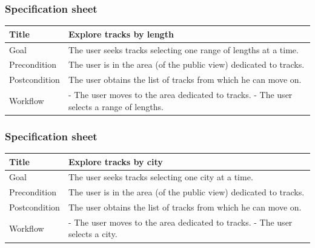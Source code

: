 \documentclass{beamer}
\begin{document}
\begin{frame}
    \frametitle{Specification sheet}
    \begin{table}
        \tiny
        \begin{tabular}{|p{2cm}|p{6cm}|}
        \hline
        Title & \textbf{Explore tracks by length} \\
        \hline
        Goal & The user seeks tracks selecting one range of lengths at a time. \\
        \hline
        Precondition & The user is in the area (of the public view) dedicated to tracks.\\
        \hline
        Postcondition & The user obtains the list of tracks from which he can move on.\\
        \hline
        Workflow &
        - The user moves to the area dedicated to tracks. \newline
        - The user selects a range of lengths. \\
        \hline
        \end{tabular}
\end{table}
\end{frame}

\begin{frame}
    \frametitle{Specification sheet}
    \begin{table}
        \tiny
        \begin{tabular}{|p{2cm}|p{6cm}|}
        \hline
        Title & \textbf{Explore tracks by city} \\
        \hline
        Goal & The user seeks tracks selecting one city at a time. \\
        \hline
        Precondition & The user is in the area (of the public view) dedicated to tracks.\\
        \hline
        Postcondition & The user obtains the list of tracks from which he can move on.\\
        \hline
        Workflow &
        - The user moves to the area dedicated to tracks. \newline
        - The user selects a city. \\
        \hline
        \end{tabular}
\end{table}
\end{frame}
\end{document}
